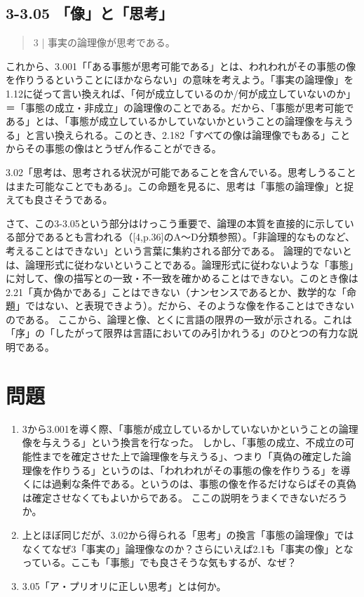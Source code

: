 \documentclass[11pt,a4paper]{jsbook}
\begin{document}
\subsection{3-3.05 「像」と「思考」}
\begin{quote}
3 | 事実の論理像が思考である。
\end{quote}
これから、3.001「「ある事態が思考可能である」とは、われわれがその事態の像を作りうるということにほかならない」の意味を考えよう。「事実の論理像」を1.12に従って言い換えれば、「何が成立しているのか/何が成立していないのか」＝「事態の成立・非成立」の論理像のことである。だから、「事態が思考可能である」とは、「事態が成立しているかしていないかということの論理像を与えうる」と言い換えられる。このとき、2.182「すべての像は論理像でもある」ことからその事態の像はとうぜん作ることができる。

3.02「思考は、思考される状況が可能であることを含んでいる。思考しうることはまた可能なことでもある」。この命題を見るに、思考は「事態の論理像」と捉えても良さそうである。

さて、この3-3.05という部分はけっこう重要で、論理の本質を直接的に示している部分であるとも言われる（[4,p.36]のA〜D分類参照）。「非論理的なものなど、考えることはできない」という言葉に集約される部分である。
論理的でないとは、論理形式に従わないということである。論理形式に従わないような「事態」に対して、像の描写との一致・不一致を確かめることはできない。このとき像は2.21「真か偽かである」ことはできない（ナンセンスであるとか、数学的な「命題」ではない、と表現できよう）。だから、そのような像を作ることはできないのである。
ここから、論理と像、とくに言語の限界の一致が示される。これは「序」の「したがって限界は言語においてのみ引かれうる」のひとつの有力な説明である。


\section{問題} \label{konkadai}
\begin{enumerate}
\item
3から3.001を導く際、「事態が成立しているかしていないかということの論理像を与えうる」という換言を行なった。
しかし、「事態の成立、不成立の可能性までを確定させた上で論理像を与えうる」、つまり「真偽の確定した論理像を作りうる」というのは、「われわれがその事態の像を作りうる」を導くには過剰な条件である。というのは、事態の像を作るだけならばその真偽は確定させなくてもよいからである。
ここの説明をうまくできないだろうか。
\item
上とほぼ同じだが、3.02から得られる「思考」の換言「事態の論理像」ではなくてなぜ3「事実の」論理像なのか？さらにいえば2.1も「事実の像」となっている。ここも「事態」でも良さそうな気もするが、なぜ？
\item
3.05「ア・プリオリに正しい思考」とは何か。
\end{enumerate}
\end{document}
